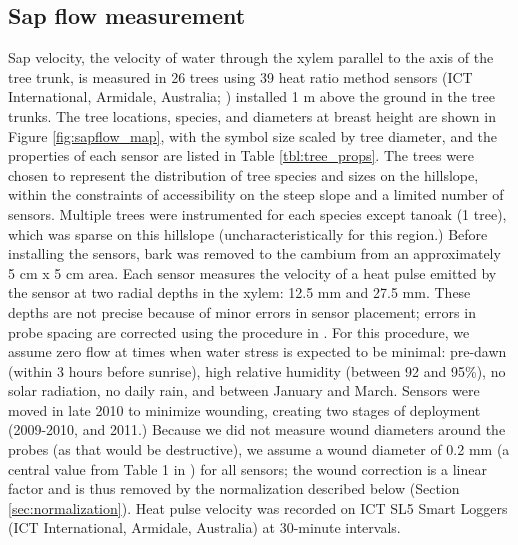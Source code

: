\subsection{Sap flow measurement}
Sap velocity, the velocity of water through the xylem parallel to the axis of the tree trunk, is measured in 26 trees using 39 heat ratio method sensors (ICT International, Armidale, Australia; \cite{burgess2001improved}) installed 1 m above the ground in the tree trunks.  The tree locations, species, and diameters at breast height are shown in Figure \ref{fig:sapflow_map}, with the symbol size scaled by tree diameter, and the properties of each sensor are listed in Table \ref{tbl:tree_props}.  The trees were chosen to represent the distribution of tree species and sizes on the hillslope, within the constraints of accessibility on the steep slope and a limited number of sensors.  Multiple trees were instrumented for each species except tanoak (1 tree), which was sparse on this hillslope (uncharacteristically for this region.)  Before installing the sensors, bark was removed to the cambium from an approximately 5 cm x 5 cm area.  Each sensor measures the velocity of a heat pulse emitted by the sensor at two radial depths in the xylem: 12.5 mm and 27.5 mm.  These depths are not precise because of minor errors in sensor placement; errors in probe spacing are corrected using the procedure in \cite{burgess2001improved}.  For this procedure, we assume zero flow at times when water stress is expected to be minimal: pre-dawn (within 3 hours before sunrise), high relative humidity (between 92 and 95\%), no solar radiation, no daily rain, and between January and March.  Sensors were moved in late 2010 to minimize wounding, creating two stages of deployment (2009-2010, and 2011.)  Because we did not measure wound diameters around the probes (as that would be destructive), we assume a wound diameter of 0.2 mm (a central value from Table 1 in \cite{burgess2001improved}) for all sensors; the wound correction is a linear factor and is thus removed by the normalization described below (Section \ref{sec:normalization}).  Heat pulse velocity was recorded on ICT SL5 Smart Loggers (ICT International, Armidale, Australia) at 30-minute intervals.

